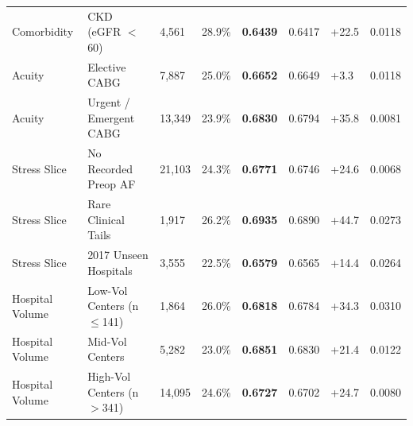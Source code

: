 \begin{table}[H]
\begin{tabularx}{\textwidth}{@{}L{2.3cm} Y R{1.15cm} R{1.15cm} R{1.45cm} R{1.45cm} R{1.25cm} R{1.15cm}@{}}
Comorbidity & CKD (eGFR $<$ 60) & 4,561 & 28.9\% & \textbf{0.6439} & 0.6417 & +22.5 & 0.0118 \\
Acuity & Elective CABG & 7,887 & 25.0\% & \textbf{0.6652} & 0.6649 & +3.3 & 0.0118 \\
Acuity & Urgent / Emergent CABG & 13,349 & 23.9\% & \textbf{0.6830} & 0.6794 & +35.8 & 0.0081 \\
Stress Slice & No Recorded Preop AF & 21,103 & 24.3\% & \textbf{0.6771} & 0.6746 & +24.6 & 0.0068 \\
Stress Slice & Rare Clinical Tails & 1,917 & 26.2\% & \textbf{0.6935} & 0.6890 & +44.7 & 0.0273 \\
Stress Slice & 2017 Unseen Hospitals & 3,555 & 22.5\% & \textbf{0.6579} & 0.6565 & +14.4 & 0.0264 \\
Hospital Volume & Low-Vol Centers (n$\le$141) & 1,864 & 26.0\% & \textbf{0.6818} & 0.6784 & +34.3 & 0.0310 \\
Hospital Volume & Mid-Vol Centers & 5,282 & 23.0\% & \textbf{0.6851} & 0.6830 & +21.4 & 0.0122 \\
Hospital Volume & High-Vol Centers (n$>$341) & 14,095 & 24.6\% & \textbf{0.6727} & 0.6702 & +24.7 & 0.0080 \\
\bottomrule
\end{tabularx}
\end{table}
